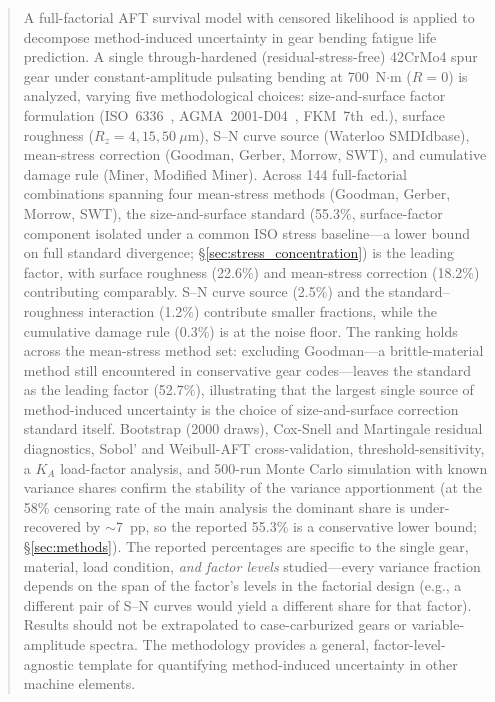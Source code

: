 \documentclass[twocolumn,12pt,a4paper]{article}
\begin{document}
\begin{abstract}
\label{sec:abstract}

A full-factorial AFT survival model with censored likelihood is
applied to decompose method-induced uncertainty in gear bending fatigue
life prediction. A single through-hardened (residual-stress-free)
42CrMo4 spur gear under constant-amplitude pulsating bending at
700~N$\cdot$m ($R=0$) is analyzed, varying five methodological choices:
size-and-surface factor formulation (ISO~6336~\cite{iso6336}, AGMA~2001-D04~\cite{agma2001},
FKM~7th~ed.), surface roughness ($R_z=4,15,50~\mu$m), S--N curve
source (Waterloo SMDIdbase), mean-stress correction (Goodman, Gerber,
Morrow, SWT), and cumulative damage rule (Miner, Modified Miner).
Across 144 full-factorial combinations spanning four mean-stress
methods (Goodman, Gerber, Morrow, SWT), the size-and-surface standard
(55.3\%, surface-factor component isolated under a common ISO stress %
baseline---a lower bound on full standard divergence;
\S\ref{sec:stress_concentration}) is the leading factor, with
surface roughness (22.6\%) and mean-stress correction (18.2\%) %
contributing comparably. S--N curve source (2.5\%) and the %
standard--roughness interaction (1.2\%) contribute smaller fractions, %
while the cumulative damage rule (0.3\%) is at the noise floor. The %
ranking holds across the mean-stress method
set: excluding Goodman---a brittle-material method still encountered
in conservative gear codes---leaves the standard as the leading
factor (52.7\%), illustrating that the largest single source of
method-induced uncertainty is the choice of size-and-surface
correction standard itself. Bootstrap (2000 draws), Cox-Snell and Martingale
residual diagnostics, Sobol' and Weibull-AFT cross-validation,
threshold-sensitivity, a $K_A$ load-factor analysis, and 500-run %
Monte Carlo simulation with known variance shares confirm
the stability of the variance apportionment (at the 58\% censoring
rate of the main analysis the dominant share is under-recovered by
$\sim$7~pp, so the reported 55.3\% is a conservative lower bound;
\S\ref{sec:methods}).
The reported percentages are specific to the single gear, material, load
condition, \emph{and factor levels} studied---every variance fraction
depends on the span of the factor's levels in the factorial design
(e.g., a different pair of S--N curves would yield a different share
for that factor). Results should not be extrapolated to case-carburized
gears or variable-amplitude spectra. The methodology provides a
general, factor-level-agnostic template for quantifying
method-induced uncertainty in other machine elements.


\end{abstract}
\end{document}
